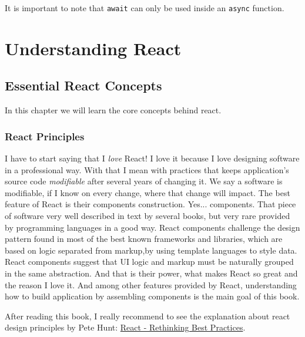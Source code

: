 \documentclass[a4paper, oneside, titlepage, 12pt]{book}
\begin{document}
It is important to note that \texttt{await} can only be used inside an \texttt{async} function.

\part{Understanding React}

\chapter{Essential React Concepts}

In this chapter we will learn the core concepts behind react.  

\section{React Principles} \label{react_mindset}


I have to start saying that I \textit{love} React! I love it because I love designing software in a professional way. With that I mean with practices that keeps application's source code \textit{modifiable} after several years of changing it. We say a software is modifiable, if I know on every change, where that change will impact. The best feature of React is their components construction. Yes... components. That piece of software very well described in text by several books, but very rare provided by programming languages in a good way. React components challenge the design pattern found in most of the best known frameworks and libraries, which are based on logic separated from markup,by using template languages to style data. React components suggest that UI logic and markup must be naturally grouped in the same abstraction. And that is their power, what makes React so great and the reason I love it. And among other features provided by React, understanding how to build application by assembling components is the main goal of this book. 
\newline

After reading this book, I really recommend to see the explanation about react design principles by Pete Hunt: \href{https://www.youtube.com/watch?v=DgVS-zXgMTk}{React - Rethinking Best Practices}.

\end{document}
